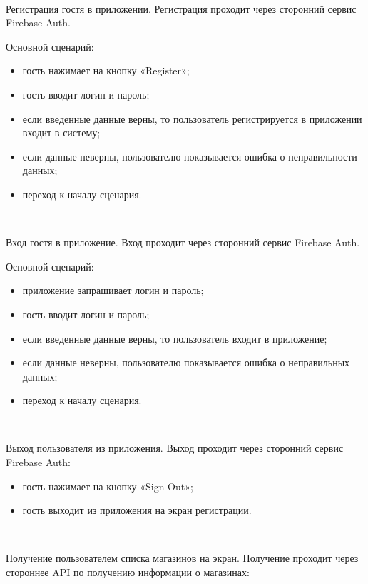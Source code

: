 ~\par

Регистрация гостя в приложении. Регистрация проходит через сторонний сервис Firebase Auth.

Основной сценарий:

\begin{itemize}
  \item гость нажимает на кнопку «Register»;
  \item гость вводит логин и пароль;
  \item если введенные данные верны, то пользователь регистрируется в приложении входит в систему;
  \item если данные неверны, пользователю показывается ошибка о неправильности данных;
  \item переход к началу сценария.
\end{itemize}

~\par

Вход гостя в приложение. Вход проходит через сторонний сервис Firebase Auth.

Основной сценарий:

\begin{itemize}
  \item приложение запрашивает логин и пароль;
  \item гость вводит логин и пароль;
  \item если введенные данные верны, то пользователь входит в приложение;
  \item если данные неверны, пользователю показывается ошибка о неправильных данных;
  \item переход к началу сценария.
\end{itemize}

~\par

Выход пользователя из приложения. Выход проходит через сторонний сервис Firebase Auth:

\begin{itemize}
  \item гость нажимает на кнопку «Sign Out»;
  \item гость выходит из приложения на экран регистрации.
\end{itemize}

~\par

Получение пользователем списка магазинов на экран. Получение проходит через стороннее API по получению информации о магазинах:

